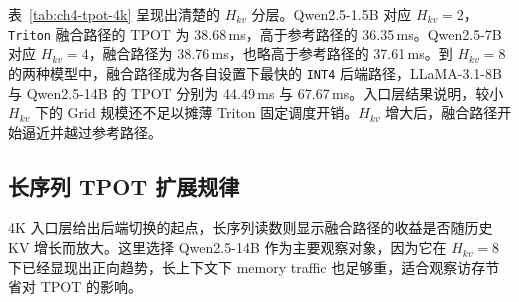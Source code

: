 表~\ref{tab:ch4-tpot-4k} 呈现出清楚的 $H_{kv}$ 分层。Qwen2.5-1.5B 对应 $H_{kv}=2$，\texttt{Triton} 融合路径的 TPOT 为 38.68\,ms，高于参考路径的 36.35\,ms。Qwen2.5-7B 对应 $H_{kv}=4$，融合路径为 38.76\,ms，也略高于参考路径的 37.61\,ms。到 $H_{kv}=8$ 的两种模型中，融合路径成为各自设置下最快的 \texttt{INT4} 后端路径，LLaMA-3.1-8B 与 Qwen2.5-14B 的 TPOT 分别为 44.49\,ms 与 67.67\,ms。入口层结果说明，较小 $H_{kv}$ 下的 Grid 规模还不足以摊薄 Triton 固定调度开销。$H_{kv}$ 增大后，融合路径开始逼近并越过参考路径。


\subsection{长序列 TPOT 扩展规律}
\label{subsec:ch4-tpot-scaling}

4K 入口层给出后端切换的起点，长序列读数则显示融合路径的收益是否随历史 KV 增长而放大。这里选择 Qwen2.5-14B 作为主要观察对象，因为它在 $H_{kv}=8$ 下已经显现出正向趋势，长上下文下 memory traffic 也足够重，适合观察访存节省对 TPOT 的影响。

